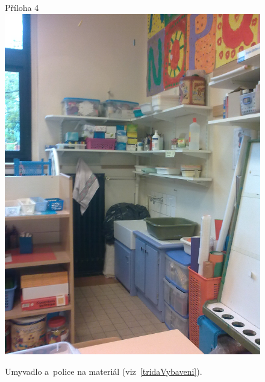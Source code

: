 	\begin{figure}[tb]
		\centering
		Příloha 4\\
		\includegraphics[height = 0.35\textheight]{./fotky/Obr4.jpg}
		\caption{
			Umyvadlo a~police na materiál (viz~\ref{tridaVybaveni}).
		}
		\label{Obr4}
	\end{figure}

